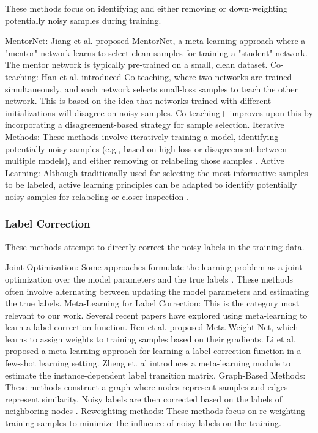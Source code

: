 These methods focus on identifying and either removing or down-weighting potentially noisy samples during training.

MentorNet:  Jiang et al. \cite{jiang2018mentornet} proposed MentorNet, a meta-learning approach where a "mentor" network learns to select clean samples for training a "student" network.  The mentor network is typically pre-trained on a small, clean dataset.
Co-teaching: Han et al. \cite{han2018co} introduced Co-teaching, where two networks are trained simultaneously, and each network selects small-loss samples to teach the other network. This is based on the idea that networks trained with different initializations will disagree on noisy samples. Co-teaching+ \cite{yu2019does} improves upon this by incorporating a disagreement-based strategy for sample selection.
Iterative Methods:  These methods involve iteratively training a model, identifying potentially noisy samples (e.g., based on high loss or disagreement between multiple models), and either removing or relabeling those samples \cite{wang2018iterative}.
Active Learning: Although traditionally used for selecting the most informative samples to be labeled, active learning principles can be adapted to identify potentially noisy samples for relabeling or closer inspection \cite{settles2009active}.

\subsubsection{Label Correction}
\label{sec:related_noisy_label}

These methods attempt to directly correct the noisy labels in the training data.

Joint Optimization: Some approaches formulate the learning problem as a joint optimization over the model parameters and the true labels \cite{tanaka2018joint, li2020dividemix, yi2019probabilistic}. These methods often involve alternating between updating the model parameters and estimating the true labels.
Meta-Learning for Label Correction:  This is the category most relevant to our work. Several recent papers have explored using meta-learning to learn a label correction function.  Ren et al. \cite{ren2018meta} proposed Meta-Weight-Net, which learns to assign weights to training samples based on their gradients.  Li et al. \cite{li2019learning} proposed a meta-learning approach for learning a label correction function in a few-shot learning setting. Zheng et. al \cite{zheng2020error} introduces a meta-learning module to estimate the instance-dependent label transition matrix.
Graph-Based Methods:  These methods construct a graph where nodes represent samples and edges represent similarity. Noisy labels are then corrected based on the labels of neighboring nodes \cite{wu2020topological, wang2021noise}.
Reweighting methods: These methods focus on re-weighting training samples to minimize the influence of noisy labels on the training.\cite{liu2015classification}

